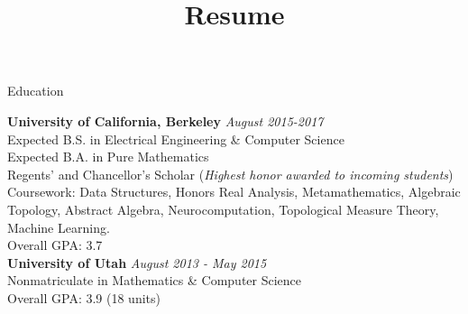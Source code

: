 \documentclass{resume} %
\title{Resume}
\begin{document}

\begin{rSection}{Education}

{\bf University of California, Berkeley} \hfill {\em August 2015-2017} \\ 
Expected B.S. in  Electrical Engineering \& Computer Science\\
Expected B.A. in Pure Mathematics \\
Regents' and Chancellor's Scholar (\textit{Highest honor awarded to incoming students}) \\
Coursework: Data Structures, {Honors} Real Analysis, Metamathematics, Algebraic Topology, Abstract Algebra, Neurocomputation, Topological Measure Theory, 
Machine Learning. \\
Overall GPA: 3.7 \\


{\bf University of Utah} \hfill {\em August 2013 - May 2015} \\ 
Nonmatriculate in Mathematics \& Computer Science \\
Overall GPA: 3.9 (18 units) \\

\end{rSection}

\end{document}
